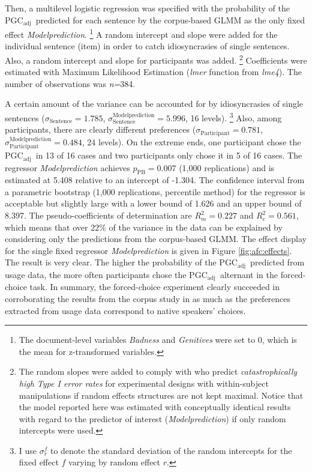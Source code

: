 \documentclass[USenglish]{article}
\newcommand{\Sub}[1]{\ensuremath{\mathrm{_{#1}}}}
\newcommand{\mpPB}{\ensuremath{p_{\text{PB}}}}
\newcommand{\PGCa}{PGC\Sub{adj}}
\begin{document}
Then, a multilevel logistic regression was specified with the probability of the \PGCa\ predicted for each sentence by the corpus-based GLMM as the only fixed effect \textit{Modelprediction}.%
\footnote{The document-level variables \textit{Badness} and \textit{Genitives} were set to 0, which is the mean for z-transformed variables.}
A random intercept and slope were added for the individual sentence (item) in order to catch idiosyncrasies of single sentences.
Also, a random intercept and slope for participants was added.%
\footnote{The random slopes were added to comply with \citet[257]{BarrEa2013} who predict \textit{catastrophically high Type I error rates} for experimental designs with within-subject manipulations if random effects structures are not kept maximal.
Notice that the model reported here was estimated with conceptually identical results with regard to the predictor of interest (\textit{Modelprediction}) if only random intercepts were used.}
Coefficients were estimated with Maximum Likelihood Estimation (\textit{lmer} function from \textit{lme4}).
The number of observations was \textit{n=}384.

A certain amount of the variance can be accounted for by idiosyncrasies of single sentences ($\sigma_{\text{Sentence}}=1.785$, $\sigma^{\text{Modelprediction}}_{\text{Sentence}}=5.996$, 16 levels).%
\footnote{I use $\sigma^f_r$ to denote the standard deviation of the random intercepts for the fixed effect $f$ varying by random effect $r$.}
Also, among participants, there are clearly different preferences ($\sigma_{\text{Participant}}=0.781$, $\sigma^{\text{Modelprediction}}_{\text{Participant}}=0.484$, 24 levels).
On the extreme ends, one participant chose the \PGCa\ in 13 of 16 cases and two participants only chose it in 5 of 16 cases.
The regressor \textit{Modelprediction} achieves $\mpPB=0.007$ (1,000 replications) and is estimated at 5.408 relative to an intercept of -1.304.
The confidence interval from a parametric bootstrap (1,000 replications, percentile method) for the regressor is acceptable but slightly large with a lower bound of 1.626 and an upper bound of 8.397.
The pseudo-coefficients of determination are $R^2_{m}=0.227$ and $R^2_{c}=0.561$, which means that over 22\% of the variance in the data can be explained by considering only the predictions from the corpus-based GLMM.
The effect display for the single fixed regressor \textit{Modelprediction} is given in Figure \ref{fig:afc:effects}.
The result is very clear.
The higher the probability of the \PGCa\ predicted from usage data, the more often participants chose the \PGCa\ alternant in the forced-choice task.
In summary, the forced-choice experiment clearly succeeded in corroborating the results from the corpus study in as much as the preferences extracted from usage data correspond to native speakers' choices.
\end{document}
